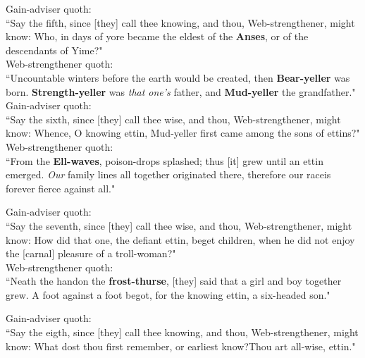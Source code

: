 \bv Gain-adviser quoth: \\ “Say the fifth, since [they] call thee knowing, and thou, Web-strengthener, might know: Who, in days of yore became the eldest of the \textbf{Anses}, or of the descendants of Yime?" \\

\bv Web-strengthener quoth: \\ “Uncountable winters before the earth would be created, then \textbf{Bear-yeller} was born. \textbf{Strength-yeller} was \emph{that one's} father, and \textbf{Mud-yeller} the grandfather." \\

\bv Gain-adviser quoth: \\ “Say the sixth, since [they] call thee wise, and thou, Web-strengthener, might know: Whence, O knowing ettin, Mud-yeller first came among the sons of ettins?" \\

\bv Web-strengthener quoth: \\ “From the \textbf{Ell-waves}, poison-drops splashed; thus [it] grew until an ettin emerged. \emph{Our} family lines all together originated there, therefore our race\footnotemark[45] is forever fierce against all.\footnotemark[46]" \\

\bv Gain-adviser quoth: \\ “Say the seventh, since [they] call thee wise, and thou, Web-strengthener, might know: How did that one, the defiant ettin, beget children, when he did not enjoy the [carnal] pleasure of a troll-woman?" \\

\bv Web-strengthener quoth: \\ “Neath the hand\footnotemark[50] on the \textbf{frost-thurse}, [they] said that a girl and boy together grew. A foot against a foot begot, for the knowing ettin, a six-headed son." \\

\bv Gain-adviser quoth: \\ “Say the eigth, since [they] call thee knowing, and thou, Web-strengthener, might know: What dost thou first remember, or earliest know?\footnotemark[55] Thou art all-wise, ettin." \\

